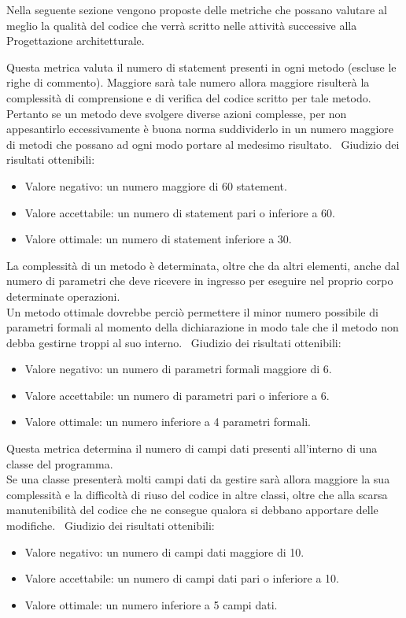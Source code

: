 \documentclass[a4paper, titlepage]{article}
\begin{document}
Nella seguente sezione vengono proposte delle metriche che possano valutare al meglio la qualità del codice che verrà scritto nelle attività successive alla Progettazione architetturale.

\label{par:statement}
Questa metrica valuta il numero di statement presenti in ogni metodo (escluse le righe di commento). Maggiore sarà tale numero allora maggiore risulterà la complessità di comprensione e di verifica del codice scritto per tale metodo. 
\\ Pertanto se un metodo deve svolgere diverse azioni complesse, per non appesantirlo eccessivamente è buona norma suddividerlo in un numero maggiore di metodi che possano ad ogni modo portare al medesimo risultato.
\
\newline Giudizio dei risultati ottenibili:
\begin{itemize}
\item Valore negativo: un numero maggiore di 60 statement.
\item Valore accettabile: un numero di statement pari o inferiore a 60. 
\item Valore ottimale: un numero di statement inferiore a 30.
\end{itemize}

La complessità di un metodo è determinata, oltre che da altri elementi, anche dal numero di parametri che deve ricevere in ingresso per eseguire nel proprio corpo determinate operazioni. 
\\ Un metodo ottimale dovrebbe perciò permettere il minor numero possibile di parametri formali al momento della dichiarazione in modo tale che il metodo non debba gestirne troppi al suo interno.
\
\newline Giudizio dei risultati ottenibili:
\begin{itemize}
\item Valore negativo: un numero di parametri formali maggiore di 6. 
\item Valore accettabile: un numero di parametri pari o inferiore a 6.
\item Valore ottimale: un numero inferiore a 4 parametri formali.
\end{itemize}

Questa metrica determina il numero di campi dati presenti all'interno di una classe del programma. \\ Se una classe presenterà molti campi dati da gestire sarà allora maggiore la sua complessità e la difficoltà di riuso del codice in altre classi, oltre che alla scarsa manutenibilità del codice che ne consegue qualora si debbano apportare delle modifiche.
\
\newline Giudizio dei risultati ottenibili:
\begin{itemize}
\item Valore negativo: un numero di campi dati maggiore di 10. 
\item Valore accettabile: un numero di campi dati pari o inferiore a 10.
\item Valore ottimale: un numero inferiore a 5 campi dati.
\end{itemize}
\end{document}

